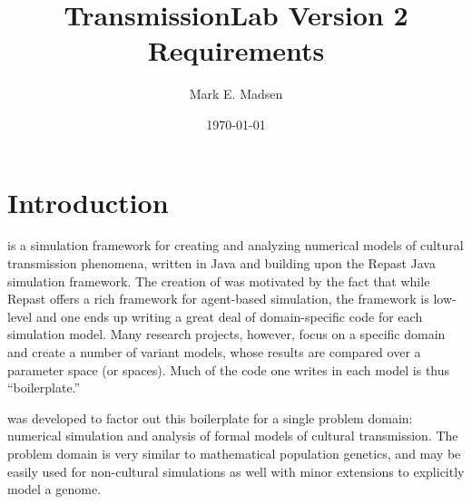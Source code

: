\documentclass[pdftex,letterpaper,rmp,groupedaddress,floatfix]{revtex4}
\begin{document}
\title{TransmissionLab Version 2 Requirements}

\author{Mark E. Madsen}
\date{\today}

\maketitle


\section{Introduction}
\tl is a simulation framework for creating and analyzing numerical models of cultural transmission phenomena, written in Java and building upon the Repast Java simulation framework.  The creation of \tl was motivated by the fact that while Repast offers a rich framework for agent-based simulation, the framework is low-level and one ends up writing a great deal of domain-specific code for each simulation model.  Many research projects, however, focus on a specific domain and create a number of variant models, whose results are compared over a parameter space (or spaces).  Much of the code one writes in each model is thus ``boilerplate.'' 

\tl was developed to factor out this boilerplate for a single problem domain:  numerical simulation and analysis of formal models of cultural transmission.  The problem domain is very similar to mathematical population genetics, and \tl may be easily used for non-cultural simulations as well with minor extensions to explicitly model a genome.  
\end{document}
